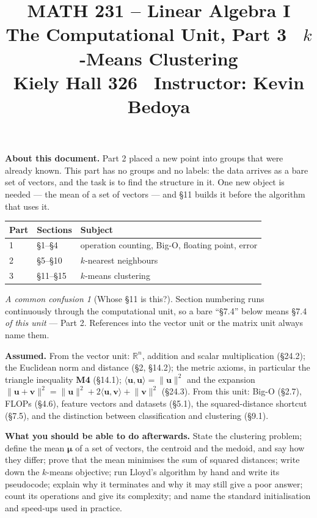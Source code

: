 \documentclass[11pt]{article}
\title{\vspace{-1.2cm}\textbf{\sffamily MATH 231 -- Linear Algebra I}\\[4pt]
       {\large\sffamily The Computational Unit, Part 3 \textbullet\
        $k$-Means Clustering}\\[2pt]
       {\normalsize\sffamily Kiely Hall 326 \textbullet\
        Instructor: Kevin Bedoya}}
\author{}
\date{}
\theoremstyle{plain}
\theoremstyle{definition}
\theoremstyle{remark}
\newtheorem*{warn}{A common confusion}
\newcommand{\R}{\mathbb{R}}
\newcommand{\vc}[1]{\mathbf{#1}}
\newcommand{\norm}[1]{\lVert #1\rVert}
\newcommand{\bmu}{\boldsymbol{\mu}}
\begin{document}
\setcounter{section}{10}  %
\maketitle
\vspace{-1.6cm}

\noindent\textbf{About this document.} Part 2 placed a new point into groups
that were already known. This part has no groups and no labels: the data arrives
as a bare set of vectors, and the task is to find the structure in it. One new
object is needed --- the mean of a set of vectors --- and \S11 builds it before
the algorithm that uses it.

\begin{center}
\renewcommand{\arraystretch}{1.2}
\begin{tabular}{@{}l l l@{}}
\toprule
\textbf{Part} & \textbf{Sections} & \textbf{Subject} \\
\midrule
1 & \S1--\S4    & operation counting, Big-O, floating point, error \\
2 & \S5--\S10   & $k$-nearest neighbours \\
3 & \S11--\S15  & $k$-means clustering \\
\bottomrule
\end{tabular}
\end{center}

\begin{warn}[Whose \S11 is this?]
Section numbering runs continuously through the computational unit, so a bare
``\S7.4'' below means \S7.4 \emph{of this unit} --- Part 2. References into the
vector unit or the matrix unit always name them.
\end{warn}

\medskip
\noindent\textbf{Assumed.} From the vector unit: $\R^{n}$, addition and scalar
multiplication (\S24.2); the Euclidean norm and distance (\S2, \S14.2); the
metric axioms, in particular the triangle inequality \textbf{M4} (\S14.1);
$\langle\vc{u},\vc{u}\rangle=\norm{\vc{u}}^{2}$ and the expansion
$\norm{\vc{u}+\vc{v}}^{2}=\norm{\vc{u}}^{2}+2\langle\vc{u},\vc{v}\rangle
+\norm{\vc{v}}^{2}$ (\S24.3). From this unit: Big-O (\S2.7), FLOPs (\S4.6),
feature vectors and datasets (\S5.1), the squared-distance shortcut (\S7.5),
and the distinction between classification and clustering (\S9.1).

\medskip
\noindent\textbf{What you should be able to do afterwards.} State the clustering
problem; define the mean $\bmu$ of a set of vectors, the centroid and the
medoid, and say how they differ; prove that the mean minimises the sum of
squared distances; write down the $k$-means objective; run Lloyd's algorithm by
hand and write its pseudocode; explain why it terminates and why it may still
give a poor answer; count its operations and give its complexity; and name the
standard initialisation and speed-ups used in practice.
\end{document}
